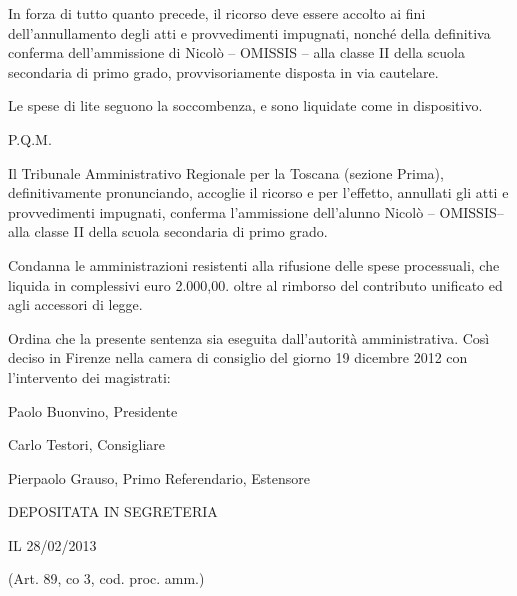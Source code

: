  In forza di tutto quanto precede, il ricorso deve essere accolto ai fini dell'annullamento degli atti e provvedimenti impugnati, nonché della definitiva conferma dell'ammissione di Nicolò -- OMISSIS -- alla classe II della scuola secondaria di primo grado, provvisoriamente disposta in via cautelare. 
 
 Le spese di lite seguono la soccombenza, e sono liquidate come in dispositivo.
 \begin{center}
 	P.Q.M.
 \end{center}
 Il Tribunale Amministrativo Regionale per la Toscana (sezione Prima), definitivamente pronunciando, accoglie il ricorso e per l'effetto, annullati gli atti e provvedimenti impugnati, conferma l'ammissione dell'alunno Nicolò -- OMISSIS-- alla classe II della scuola secondaria di primo grado.
 
 Condanna le amministrazioni resistenti alla rifusione delle spese processuali, che liquida in complessivi euro 2.000,00. oltre al rimborso del contributo unificato ed agli accessori di legge.
 
 Ordina che la presente sentenza sia eseguita dall'autorità amministrativa. 
 Così deciso in Firenze nella camera di consiglio del giorno 19 dicembre 2012 con l'intervento dei magistrati:
 
 Paolo Buonvino, Presidente
 
 Carlo Testori, Consigliare 
 
 Pierpaolo Grauso, Primo Referendario, Estensore
 \begin{center}
 	DEPOSITATA IN SEGRETERIA
 	
 	IL 28/02/2013
 	
 	(Art. 89, co 3, cod. proc. amm.)
 \end{center} 